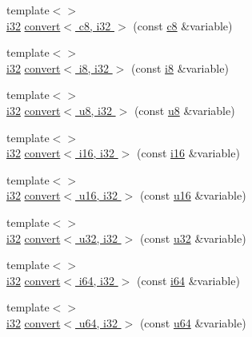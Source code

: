 \begin{DoxyCompactItemize}
\item 
{\footnotesize template$<$$>$ }\\\hyperlink{types_8h_a48d6cd8e4135fb2ff7e7f2dac84089ec}{i32} \hyperlink{namespacecrap_a98276488718f97c1a5558b8d7d719c3b}{convert$<$ c8, i32 $>$} (const \hyperlink{types_8h_aa1ba8aac9fcd831012308297336ac74b}{c8} \&variable)
\item 
{\footnotesize template$<$$>$ }\\\hyperlink{types_8h_a48d6cd8e4135fb2ff7e7f2dac84089ec}{i32} \hyperlink{namespacecrap_a074da7f4d59f287881289134e6fa9d55}{convert$<$ i8, i32 $>$} (const \hyperlink{types_8h_ae3702327b5f47e83b431e22b33da7b58}{i8} \&variable)
\item 
{\footnotesize template$<$$>$ }\\\hyperlink{types_8h_a48d6cd8e4135fb2ff7e7f2dac84089ec}{i32} \hyperlink{namespacecrap_a39d99d22cd704cf9897eebdc1275ed2f}{convert$<$ u8, i32 $>$} (const \hyperlink{types_8h_a92c50087ca0e64fa93fc59402c55f8ca}{u8} \&variable)
\item 
{\footnotesize template$<$$>$ }\\\hyperlink{types_8h_a48d6cd8e4135fb2ff7e7f2dac84089ec}{i32} \hyperlink{namespacecrap_a38eca91d528af9d5cea1ac9640cf1976}{convert$<$ i16, i32 $>$} (const \hyperlink{types_8h_ad309dbcaeea13aa602d686964156ea0b}{i16} \&variable)
\item 
{\footnotesize template$<$$>$ }\\\hyperlink{types_8h_a48d6cd8e4135fb2ff7e7f2dac84089ec}{i32} \hyperlink{namespacecrap_a9f75749980c52bb5402678b54268f3ff}{convert$<$ u16, i32 $>$} (const \hyperlink{types_8h_ace9d960e74685e2cd84b36132dbbf8aa}{u16} \&variable)
\item 
{\footnotesize template$<$$>$ }\\\hyperlink{types_8h_a48d6cd8e4135fb2ff7e7f2dac84089ec}{i32} \hyperlink{namespacecrap_a87fd5f52aae97d817fef6bca16c75b06}{convert$<$ u32, i32 $>$} (const \hyperlink{types_8h_afaa62991928fb9fb18ff0db62a040aba}{u32} \&variable)
\item 
{\footnotesize template$<$$>$ }\\\hyperlink{types_8h_a48d6cd8e4135fb2ff7e7f2dac84089ec}{i32} \hyperlink{namespacecrap_a7418a136393df99d1c2c63acd75f595a}{convert$<$ i64, i32 $>$} (const \hyperlink{types_8h_a85cb35fbe5bf2961d7ad5f26814a91a2}{i64} \&variable)
\item 
{\footnotesize template$<$$>$ }\\\hyperlink{types_8h_a48d6cd8e4135fb2ff7e7f2dac84089ec}{i32} \hyperlink{namespacecrap_a326a6e9725032e12166da3f82cc075e7}{convert$<$ u64, i32 $>$} (const \hyperlink{types_8h_a3f7e2bcbb0b4c338f3c4f6c937cd4234}{u64} \&variable)

\end{DoxyCompactItemize}
